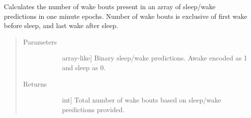 \documentclass[letterpaper,10pt,english]{sphinxmanual}
\begin{document}
\begin{fulllineitems}
\label{\detokenize{index:sleeppy.utils.number_of_wake_bouts}}
Calculates the number of wake bouts present in an array of sleep/wake predictions in one minute epochs. Number of
wake bouts is exclusive of first wake before sleep, and last wake after sleep.
\begin{quote}\begin{description}
\item[{Parameters}] \leavevmode\begin{description}
\item[{}] \leavevmode{[}array-like{]}
Binary sleep/wake predictions. Awake encoded as 1 and sleep as 0.

\end{description}

\item[{Returns}] \leavevmode\begin{description}
\item[{}] \leavevmode{[}int{]}
Total number of wake bouts based on sleep/wake predictions provided.

\end{description}

\end{description}\end{quote}

\end{fulllineitems}

\end{document}
